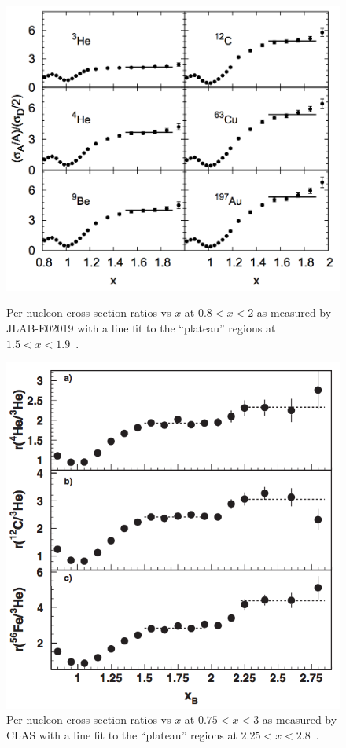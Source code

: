 \begin{figure}[!tbp]
	\centering
	\begin{minipage}[b]{.4\textwidth}
		\centering
		\includegraphics[height=0.3\textheight]{figures/background/nn-src-plateau.png}
		\caption{Per nucleon cross section ratios vs $x$ at $0.8<x<2$ as measured by JLAB-E02019 with a line fit to the ``plateau'' regions at $1.5<x<1.9$~\cite{Fomin:2011ng}.}
		\label{fig:nn-src-plateau}
	\end{minipage}%
	\hfill
	\begin{minipage}[b]{.4\textwidth}
		\centering
		\includegraphics[height=0.3\textheight]{figures/background/CLAS-nnn-src-ratio.png}
		\caption{Per nucleon cross section ratios vs $x$ at $0.75<x<3$ as measured by CLAS with a line fit to the ``plateau'' regions  at $2.25<x<2.8$~\cite{PhysRevLett.96.082501}.}
		\label{fig:nnn-src-plateau}
	\end{minipage}
\end{figure}

